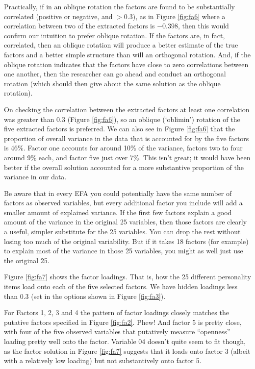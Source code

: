 Practically, if in an oblique rotation the factors are found to be substantially correlated (positive or negative, and $>0.3$), as in Figure \ref{fig:fa6} where a correlation between two of the extracted factors is $-0.398$, then this would confirm our intuition to prefer oblique rotation. If the factors are, in fact, correlated, then an oblique rotation will produce a better estimate of the true factors and a better simple structure than will an orthogonal rotation. And, if the oblique rotation indicates that the factors have close to zero correlations between one another, then the researcher can go ahead and conduct an orthogonal rotation (which should then give about the same solution as the oblique rotation).

On checking the correlation between the extracted factors at least one correlation was greater than 0.3 (Figure \ref{fig:fa6}), so an oblique (`oblimin') rotation of the five extracted factors is preferred. We can also see in Figure \ref{fig:fa6} that the proportion of overall variance in the data that is accounted for by the five factors is 46\%. Factor one accounts for around 10\% of the variance, factors two to four around 9\% each, and factor five just over 7\%. This isn’t great; it would have been better if the overall solution accounted for a more substantive proportion of the variance in our data.

Be aware that in every EFA you could potentially have the same number of factors as observed variables, but every additional factor you include will add a smaller amount of explained variance. If the first few factors explain a good amount of the variance in the original 25 variables, then those factors are clearly a useful, simpler substitute for the 25 variables. You can drop the rest without losing too much of the original variability. But if it takes 18 factors (for example) to explain most of the variance in those 25 variables, you might as well just use the original 25.

Figure \ref{fig:fa7} shows the factor loadings. That is, how the 25 different personality items load onto each of the five selected factors. We have hidden loadings less than 0.3 (set in the options shown in Figure \ref{fig:fa3}).
 
For Factors 1, 2, 3 and 4 the pattern of factor loadings closely matches the putative factors specified in Figure \ref{fig:fa2}. Phew! And factor 5 is pretty close, with four of the five observed variables that putatively measure “openness” loading pretty well onto the factor. Variable 04 doesn’t quite seem to fit though, as the factor solution in Figure \ref{fig:fa7} suggests that it loads onto factor 3 (albeit with a relatively low loading) but not substantively onto factor 5.

